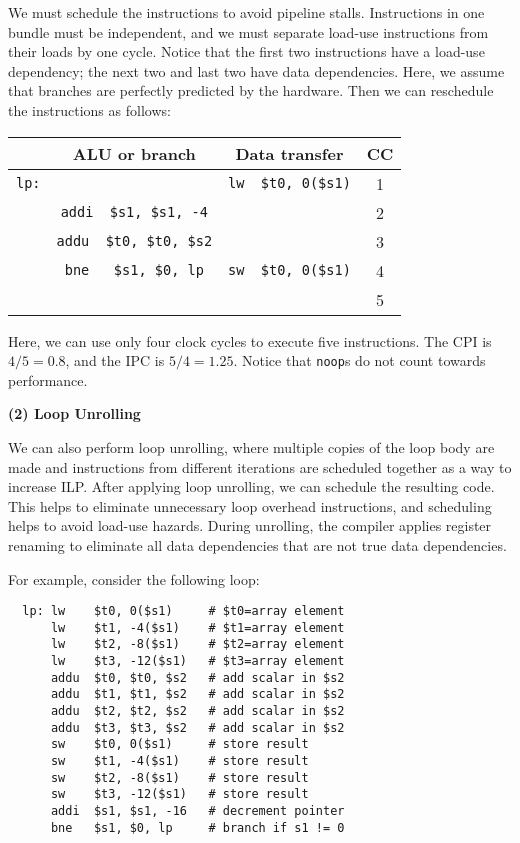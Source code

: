 We must schedule the instructions to avoid pipeline stalls. Instructions in one bundle must be independent, and we must separate load-use instructions from their loads by one cycle. Notice that the first two instructions have a load-use dependency; the next two and last two have data dependencies. Here, we assume that branches are perfectly predicted by the hardware. Then we can reschedule the instructions as follows:

\begin{table}[H]
  \centering
  \begin{tabular}{c|c|c|c}
      \toprule
       & ALU or branch & Data transfer & CC  \\
    \midrule
      \verb|lp:| &  & \verb|lw  $t0, 0($s1)| & 1  \\
       & \verb|addi  $s1, $s1, -4| &  & 2  \\
       & \verb|addu  $t0, $t0, $s2| &  & 3  \\
       & \verb|bne   $s1, $0, lp| & \verb|sw  $t0, 0($s1)| & 4  \\
       &  &  & 5  \\
      \bottomrule
  \end{tabular}
\end{table}

Here, we can use only four clock cycles to execute five instructions. The CPI is \(4 / 5 = 0.8\), and the IPC is \(5 / 4 = 1.25\). Notice that \verb|noop|s do not count towards performance.

\textbf{(2) Loop Unrolling}

We can also perform loop unrolling, where multiple copies of the loop body are made and instructions from different iterations are scheduled together as a way to increase ILP. After applying loop unrolling, we can schedule the resulting code. This helps to eliminate unnecessary loop overhead instructions, and scheduling helps to avoid load-use hazards. During unrolling, the compiler applies register renaming to eliminate all data dependencies that are not true data dependencies.

For example, consider the following loop: 
\begin{verbatim}
  lp: lw    $t0, 0($s1)     # $t0=array element
      lw    $t1, -4($s1)    # $t1=array element
      lw    $t2, -8($s1)    # $t2=array element
      lw    $t3, -12($s1)   # $t3=array element
      addu  $t0, $t0, $s2   # add scalar in $s2
      addu  $t1, $t1, $s2   # add scalar in $s2
      addu  $t2, $t2, $s2   # add scalar in $s2
      addu  $t3, $t3, $s2   # add scalar in $s2
      sw    $t0, 0($s1)     # store result
      sw    $t1, -4($s1)    # store result
      sw    $t2, -8($s1)    # store result
      sw    $t3, -12($s1)   # store result
      addi  $s1, $s1, -16   # decrement pointer
      bne   $s1, $0, lp     # branch if s1 != 0
\end{verbatim}

